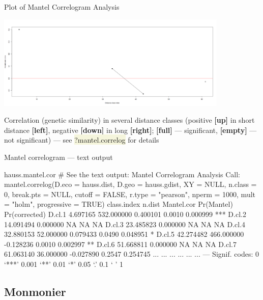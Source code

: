 \documentclass[compress, ucs, xelatex, 11pt, xcolor=svgnames, aspectratio=169,
	hyperref={
		bookmarks=true,
		unicode=true,
		colorlinks=true,
		pdftitle={Molecular data in R},
		plainpages=false,
		pdfauthor={Vojtech Zeisek},
		pdfsubject={Course about phylogeny and evolution in R},
		pdfcreator={XeLaTeX},
		pdfkeywords={R, evolution, phylogeny, molecular data},
		linkcolor=Crimson, %
		anchorcolor=Magenta, %
		citecolor=Magenta, %
		filecolor=Magenta, %
		menucolor=Magenta, %
		urlcolor=DodgerBlue, %
		pdftex},
	url={hyphens, lowtilde} %
	]{beamer}
\renewcommand{\texttt}[1]{\colorbox{Beige}{{\ttfamily #1}}}
\begin{document}
\begin{frame}{Plot of Mantel Correlogram Analysis}
	\begin{center}
		\includegraphics[height=4.5cm]{mantel-cor.png}
	\end{center}
	\vfil
	Correlation (genetic similarity) in several distance classes (positive \textbf{[up]} in short distance \textbf{[left]}, negative \textbf{[down]} in long \textbf{[right]}; \textbf{[full]} --- significant, \textbf{[empty]} --- not significant) --- see \texttt{?mantel.correlog} for details
	\vfill
\end{frame}

\begin{frame}[fragile]{Mantel correlogram --- text output}
	\begin{spluscode}
    hauss.mantel.cor # See the text output:
    Mantel Correlogram Analysis
    Call:
    mantel.correlog(D.eco = hauss.dist, D.geo = hauss.gdist, XY = NULL,
      n.class = 0, break.pts = NULL, cutoff = FALSE, r.type = "pearson",
      nperm = 1000, mult = "holm", progressive = TRUE)
            class.index     n.dist Mantel.cor Pr(Mantel) Pr(corrected)
    D.cl.1     4.697165 532.000000   0.400101     0.0010      0.000999 ***
    D.cl.2    14.091494   0.000000         NA         NA            NA
    D.cl.3    23.485823   0.000000         NA         NA            NA
    D.cl.4    32.880153  52.000000   0.079433     0.0490      0.048951 *
    D.cl.5    42.274482 466.000000  -0.128236     0.0010      0.002997 **
    D.cl.6    51.668811   0.000000         NA         NA            NA
    D.cl.7    61.063140  36.000000  -0.027890     0.2547      0.254745
       ...          ...        ...        ...        ...           ...
    ---
    Signif. codes:  0 ‘***’ 0.001 ‘**’ 0.01 ‘*’ 0.05 ‘.’ 0.1 ‘ ’ 1
	\end{spluscode}
\end{frame}

\subsection{Monmonier}
\end{document}
